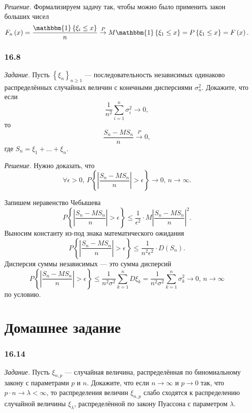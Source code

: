 \textit{Решение.} Формализируем задачу так, чтобы можно было применить закон больших чисел
$$F_n \left( x \right) =
  \frac{ \mathbbm{1} \left\{ \xi_i \leq x \right\}}{n} \overset{P}{ \rightarrow }
  M \mathbbm{1} \left\{ \xi_1 \leq x \right\} =
  P \left\{ \xi_1 \leq x \right\} =
  F \left( x \right).$$

\subsubsection*{16.8}

\textit{Задание.}
Пусть $ \left\{ \xi_n \right\}_{n \geq 1}$ ---
последовательность независимых одинаково распределённых случайных величин с конечными дисперсиями
$ \sigma_n^2$.
Докажите, что если
$$ \frac{1}{n^2} \sum \limits_{i = 1}^n \sigma_i^2 \to 0,$$
то
$$ \frac{ S_n - MS_n}{n} \overset{P}{ \rightarrow } 0,$$
где $S_n = \xi_1 + \dotsc + \xi_n$.

\textit{Решение.} Нужно доказать, что
$$ \forall \epsilon > 0, \,
  P \left\{ \left| \frac{S_n - MS_n}{n} \right| > \epsilon \right\} \to 0, \,
  n \to \infty.$$

Запишем неравенство Чебышева
$$P \left\{ \left| \frac{S_n - MS_n}{n} \right| > \epsilon \right\} \leq
  \frac{1}{ \epsilon^2} \cdot M \left| \frac{S_n - MS_n}{n} \right|^2.$$
Выносим константу из-под знака математического ожидания
$$P \left\{ \left| \frac{S_n - MS_n}{n} \right| > \epsilon \right\} \leq
  \frac{1}{n^2 \epsilon^2} \cdot D \left( S_n \right).$$
Дисперсия суммы независимых --- это сумма дисперсий
$$P \left\{ \left| \frac{S_n - MS_n}{n} \right| > \epsilon \right\} \leq
  \frac{1}{n^2 \sigma^2} \sum \limits_{k = 1}^n D \xi_k =
  \frac{1}{n^2 \sigma^2} \sum \limits_{k = 1}^n \sigma_k^2 \to
  0, \,
  n \to \infty $$
  по условию.

\section*{Домашнее задание}

\subsubsection*{16.14}

\textit{Задание.} Пусть $ \xi_{n, p}$ --- случайная величина,
распределённая по биномиальному закону с параметрами $p$ и $n$.
Докажите, что если $n \rightarrow \infty $ и $p \rightarrow 0$ так, что
$p \cdot n \rightarrow \lambda < \infty $,
то распределения величин $ \xi_{n, p}$ слабо сходятся к распределению случайной величины
$ \xi_{ \lambda }$, распределённой по закону Пуассона с параметром $ \lambda $.

